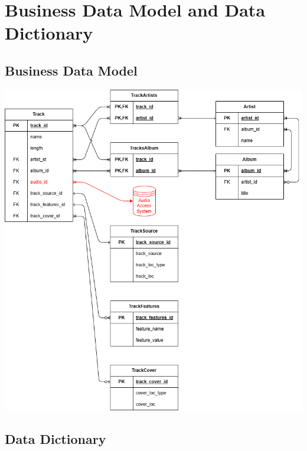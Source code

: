 \documentclass[12pt]{article}
\begin{document}
\section{Business Data Model and Data Dictionary}
\subsection{Business Data Model}
\includegraphics[width=\textwidth]{7_1_business_data_model.png}
\subsection{Data Dictionary}
\end{document}
